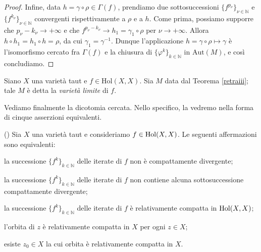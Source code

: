 \begin{proof}
    Infine, data $h=\gamma\circ\rho\in\Gamma(f)$, prendiamo due sottosuccessioni $\{f^{p_\nu}\}_{\nu\in\mathbb{N}}$ e $\{f^{k_\nu}\}_{\nu\in\mathbb{N}}$ convergenti rispettivamente a $\rho$ e a $h$. Come prima, possiamo supporre che $p_\nu-k_\nu \longrightarrow+\infty$ e che $f^{p_\nu-k_\nu} \longrightarrow h_1=\gamma_1\circ\rho$ per $\nu\longrightarrow+\infty$. Allora $h\circ h_1=h_1\circ h=\rho$, da cui $\gamma_1=\gamma^{-1}$. Dunque l'applicazione $h=\gamma\circ\rho\longmapsto\gamma$ è l'isomorfismo cercato fra $\Gamma(f)$ e la chiusura di $\{\varphi^k\}_{k\in\mathbb{N}}$ in $\text{Aut}(M)$, e così concludiamo.
\end{proof}

\begin{defn}
    Siano $X$ una varietà taut e $f\in\text{Hol}(X,X)$. Sia $M$ data dal Teorema \ref{retraiii}; tale $M$ è detta la \textit{varietà limite} di $f$.
\end{defn}

Vediamo finalmente la dicotomia cercata. Nello specifico, la vedremo nella forma di cinque asserzioni equivalenti.

\begin{thm} \label{dicotomia}
    (\cite[Theorem 1.1]{A4}) Sia $X$ una varietà taut e consideriamo $f \in \textnormal{Hol}(X,X)$. Le seguenti affermazioni sono equivalenti:
    \begin{nlist}
        \item la successione $\{f^k\}_{k \in \mathbb{N}}$ delle iterate di $f$ non è compattamente divergente;
        \item la successione $\{f^k\}_{k \in \mathbb{N}}$ delle iterate di $f$ non contiene alcuna sottosuccessione compattamente divergente;
        \item la successione $\{f^k\}_{k \in \mathbb{N}}$ delle iterate di $f$ è relativamente compatta in $\textnormal{Hol}(X,X)$;
        \item l'orbita di $z$ è relativamente compatta in $X$ per ogni $z \in X$;
        \item esiste $z_0 \in X$ la cui orbita è relativamente compatta in $X$.
    \end{nlist}
\end{thm}

